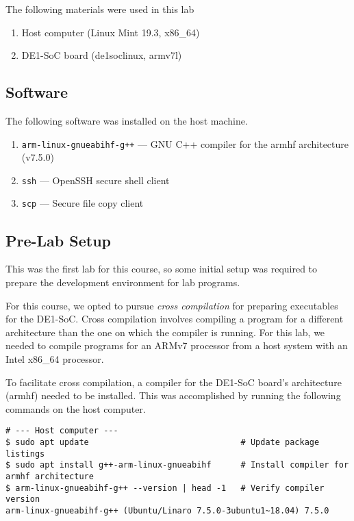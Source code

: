 \documentclass[11pt, letterpaper]{article} %
\begin{document}
The following materials were used in this lab
\begin{enumerate}
    \item Host computer (Linux Mint 19.3, x86\_64) %
    \item DE1-SoC board (de1soclinux, armv7l) %
\end{enumerate}

\subsection*{Software}
The following software was installed on the host machine.
\begin{enumerate}
    \item \texttt{arm-linux-gnueabihf-g++} --- GNU C++ compiler for the armhf architecture (v7.5.0)
    \item \texttt{ssh} --- OpenSSH secure shell client
    \item \texttt{scp} --- Secure file copy client
\end{enumerate}

\subsection*{Pre-Lab Setup}

This was the first lab for this course, so some initial setup was required to prepare the development environment for lab programs.

For this course, we opted to pursue \emph{cross compilation} for preparing executables for the DE1-SoC. Cross compilation involves compiling a program for a different architecture than the one on which the compiler is running. For this lab, we needed to compile programs for an ARMv7 processor	from a host system with an Intel x86\_64 processor.

%
%

To facilitate cross compilation, a compiler for the DE1-SoC board's architecture (armhf) needed to be installed. This was accomplished by running the following commands on the host computer.
\pagebreak[2] %
\begin{lstlisting}[style=labreportstyle-sh]
# --- Host computer --- 
$ sudo apt update                               # Update package listings
$ sudo apt install g++-arm-linux-gnueabihf      # Install compiler for armhf architecture
$ arm-linux-gnueabihf-g++ --version | head -1   # Verify compiler version
arm-linux-gnueabihf-g++ (Ubuntu/Linaro 7.5.0-3ubuntu1~18.04) 7.5.0
\end{lstlisting}
\end{document}
